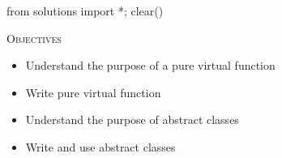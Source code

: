 \begin{python0}
from solutions import *; clear()
\end{python0}

\textsc{Objectives}

\begin{itemize}
\item
  Understand the purpose of a pure virtual function
\item
  Write pure virtual function
\item
  Understand the purpose of abstract classes
\item
  Write and use abstract classes
\end{itemize}

